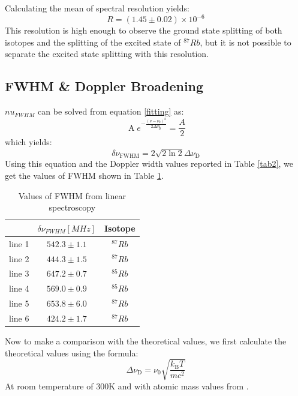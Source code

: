 \documentclass[12pt]{article}
\begin{document}
Calculating the mean of spectral resolution yields:
\begin{equation*}
R = (1.45 \pm 0.02) \times 10^{-6}
\end{equation*}
This resolution is high enough to observe the ground state splitting of both isotopes and the splitting of the excited state of $^{87}Rb$, but it is not possible to separate the excited state splitting with this resolution. 

\subsection{FWHM \& Doppler Broadening}
$nu_{FWHM}$ can be solved from equation \ref{fitting} as:
\begin{equation*}
       \operatorname{A} e^{-\frac{\left(\nu-\nu_0\right)^2}{2 \Delta \nu_{\mathrm{D}}^2}} = \frac{A}{2}
\end{equation*}
which yields:
\begin{equation*}
\delta \nu_{\mathrm{FWHM}}=2 \sqrt{2 \ln 2} \Delta \nu_{\mathrm{D}}
\end{equation*}
 Using this equation and the Doppler width values reported in Table \ref{tab2}, we get the values of FWHM shown in Table \ref{tab5}.

 \begin{table}[H] \centering  \begin{tabular}{c|c|c} 
\hline
\hline 
& $\delta \nu_{FWHM} [MHz]$ &  Isotope \\
\hline 
line 1 & $542.3 \pm 1.1$ & $^{87}Rb$ \\
line 2 & $444.3 \pm 1.5$ & $^{87}Rb$ \\
line 3 & $647.2 \pm 0.7$ & $^{85}Rb$ \\
line 4 & $569.0 \pm 0.9$ & $^{85}Rb$ \\
line 5 & $653.8 \pm 6.0$ & $^{87}Rb$ \\
line 6 & $424.2 \pm 1.7$ & $^{87}Rb$ \\

\hline 
\end{tabular}
\caption{Values of FWHM from linear spectroscopy}
\label{tab5} 
\end{table}

Now to make a comparison with the theoretical values, we first calculate the theoretical values using the formula:
\begin{equation*}
\Delta \nu_{\mathrm{D}}=\nu_0 \sqrt{\frac{k_{\mathrm{B}} T}{m c^2}}
\end{equation*}
At room temperature of 300K and with atomic mass values from \cite{Rb85}\cite{Rb87}. 
\end{document}
